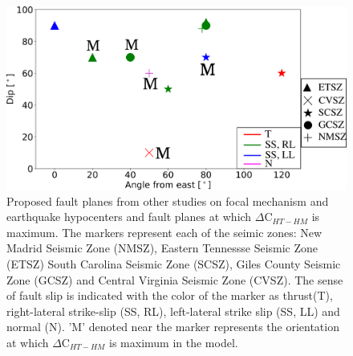 \documentclass[draft,linenumbers]{agujournal2018}
\begin{document}
\begin{figure}[ht]
    \centering
    \includegraphics[width=0.8\linewidth]{figures/summ_stress.png}
    \caption{Proposed fault planes from other studies on focal mechanism and earthquake hypocenters and fault planes at which $\Delta$C$_{HT-HM}$ is maximum. The markers represent each of the seimic zones: New Madrid Seismic Zone (NMSZ), Eastern Tennessse Seismic Zone (ETSZ) South Carolina Seismic Zone (SCSZ), Giles County Seismic Zone (GCSZ) and Central Virginia Seismic Zone (CVSZ). The sense of fault slip is indicated with the color of the marker as thrust(T), right-lateral strike-slip (SS, RL), left-lateral strike slip (SS, LL) and normal (N). 'M' denoted near the marker represents the orientation at which $\Delta$C$_{HT-HM}$ is maximum in the model.}
    \label{summary}
\end{figure}
\end{document}
